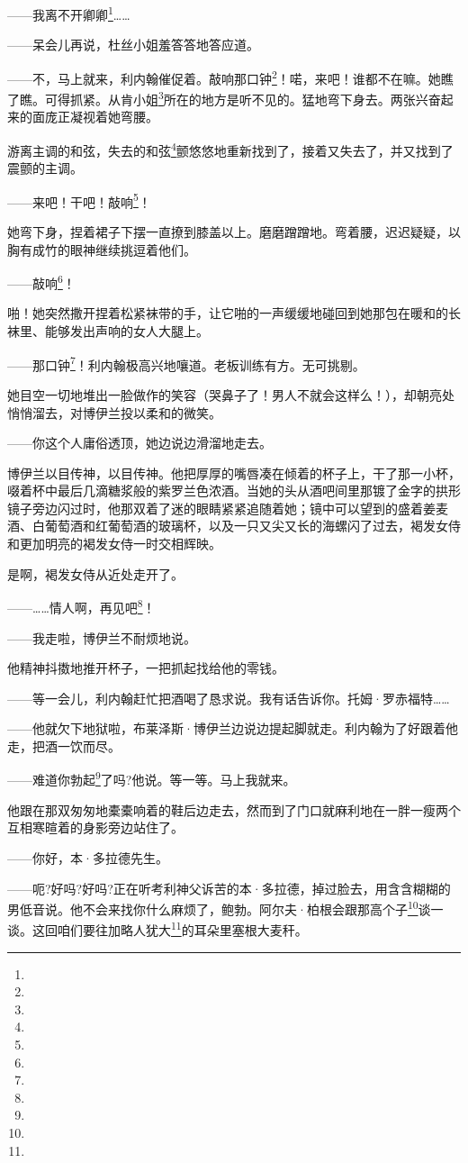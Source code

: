 \par ——我离不开卿卿\footnote{}……
\par ——呆会儿再说，杜丝小姐羞答答地答应道。
\par ——不，马上就来，利内翰催促着。敲响那口钟\footnote{}！喏，来吧！谁都不在嘛。她瞧了瞧。可得抓紧。从肯小姐\footnote{}所在的地方是听不见的。猛地弯下身去。两张兴奋起来的面庞正凝视着她弯腰。
\par 游离主调的和弦，失去的和弦\footnote{}颤悠悠地重新找到了，接着又失去了，并又找到了震颤的主调。
\par ——来吧！干吧！敲响\footnote{}！
\par 她弯下身，捏着裙子下摆一直撩到膝盖以上。磨磨蹭蹭地。弯着腰，迟迟疑疑，以胸有成竹的眼神继续挑逗着他们。
\par ——敲响\footnote{}！
\par 啪！她突然撒开捏着松紧袜带的手，让它啪的一声缓缓地碰回到她那包在暖和的长袜里、能够发出声响的女人大腿上。
\par ——那口钟\footnote{}！利内翰极高兴地嚷道。老板训练有方。无可挑剔。
\par 她目空一切地堆出一脸做作的笑容（哭鼻子了！男人不就会这样么！），却朝亮处悄悄溜去，对博伊兰投以柔和的微笑。
\par ——你这个人庸俗透顶，她边说边滑溜地走去。
\par 博伊兰以目传神，以目传神。他把厚厚的嘴唇凑在倾着的杯子上，干了那一小杯，啜着杯中最后几滴糖浆般的紫罗兰色浓酒。当她的头从酒吧间里那镀了金字的拱形镜子旁边闪过时，他那双着了迷的眼睛紧紧追随着她；镜中可以望到的盛着姜麦酒、白葡萄酒和红葡萄酒的玻璃杯，以及一只又尖又长的海螺闪了过去，褐发女侍和更加明亮的褐发女侍一时交相辉映。
\par 是啊，褐发女侍从近处走开了。
\par ——……情人啊，再见吧\footnote{}！
\par ——我走啦，博伊兰不耐烦地说。
\par 他精神抖擞地推开杯子，一把抓起找给他的零钱。
\par ——等一会儿，利内翰赶忙把酒喝了恳求说。我有话告诉你。托姆·罗赤福特……
\par ——他就欠下地狱啦，布莱泽斯·博伊兰边说边提起脚就走。利内翰为了好跟着他走，把酒一饮而尽。
\par ——难道你勃起\footnote{}了吗?他说。等一等。马上我就来。
\par 他跟在那双匆匆地橐橐响着的鞋后边走去，然而到了门口就麻利地在一胖一瘦两个互相寒暄着的身影旁边站住了。
\par ——你好，本·多拉德先生。
\par ——呃?好吗?好吗?正在听考利神父诉苦的本·多拉德，掉过脸去，用含含糊糊的男低音说。他不会来找你什么麻烦了，鲍勃。阿尔夫·柏根会跟那高个子\footnote{}谈一谈。这回咱们要往加略人犹大\footnote{}的耳朵里塞根大麦秆。
